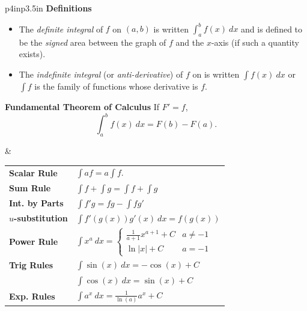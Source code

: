 \documentclass{article}
\newenvironment{bx}[1][]{
\begin{tcolorbox}[colback=white!97!black, title=#1, arc=0in, halign=flush left, left=1mm, right=1mm,]
}{
\end{tcolorbox}
}
\begin{document}
\newpage


\begin{bx}[Integration]
\begin{tabular}{p{4in}p{3.5in}}
\textbf{Definitions}
\begin{itemize}[leftmargin=1em]
    \item The \textit{definite integral} of $f$ on $(a,b)$ is written $\int_a^bf(x)\ dx$ and is defined to be the \textit{signed} area between the graph of $f$ and the $x$-axis (if such a quantity exists).
    \item The \textit{indefinite integral} (or \textit{anti-derivative}) of $f$ on is written $\int f(x)\ dx$ or $\int f$ is the family of functions whose derivative is $f$.
\end{itemize}

\vspace{0.5em}

\textbf{Fundamental Theorem of Calculus} If $F'=f$,
    $$\int_a^bf(x)\ dx = F(b)-F(a).$$


& 
\vspace{-2em}

\begin{center}
\def\arraystretch{1.5}
\begin{tabular}{@{}ll@{}}
\toprule[0.4mm]
\textbf{Scalar Rule} & $\int a f = a \int f$. \\
\textbf{Sum Rule} & $\int f + \int g= \int f + \int g$ \\
\textbf{Int. by Parts}
 & $\int f'g = fg - \int fg' $ \\
\textbf{$u$-substitution} & $\int f'(g(x))g'(x)\ dx =  f(g(x))$ \\
\midrule
\textbf{Power Rule}
 & $\displaystyle\int x^a \ dx = \begin{cases}
\frac{1}{a+1}x^{a+1} + C & a \neq -1\\
\ln|x| + C & a = -1
\end{cases}$ \\
\textbf{Trig Rules}  
& $\int \sin(x)\ dx = -\cos(x)+C$\\
& $\int \cos(x)\ dx = \sin(x)+C$ \\

\textbf{Exp. Rules} & $\int a^x\ dx = \frac{1}{\ln(a)}a^x+C$ \\
\bottomrule[0.4mm]
\end{tabular}
\end{center}
\\ 

\end{tabular}


\end{bx}
\end{document}
